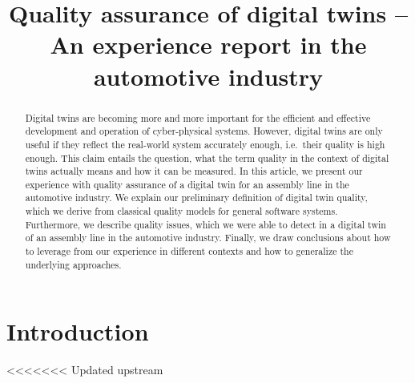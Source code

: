 \documentclass[9pt,conference]{IEEEtran}
\begin{document}
    \title{Quality assurance of digital twins -- An experience report in the automotive industry}
    \author{
        \and
    }
    \maketitle

    \begin{abstract}
        Digital twins are becoming more and more important for the efficient and effective development and operation of cyber-physical systems.
        However, digital twins are only useful if they reflect the real-world system accurately enough, i.e.\ their quality is high enough.
        This claim entails the question, what the term quality in the context of digital twins actually means and how it can be measured.
        In this article, we present our experience with quality assurance of a digital twin for an assembly line in the automotive industry.
        We explain our preliminary definition of digital twin quality, which we derive from classical quality models for general software systems.
        Furthermore, we describe quality issues, which we were able to detect in a digital twin of an assembly line in the automotive industry.
        Finally, we draw conclusions about how to leverage from our experience in different contexts and how to generalize the underlying approaches.
    \end{abstract}

    \section{Introduction}\label{section:introduction}
<<<<<<< Updated upstream
\end{document}
